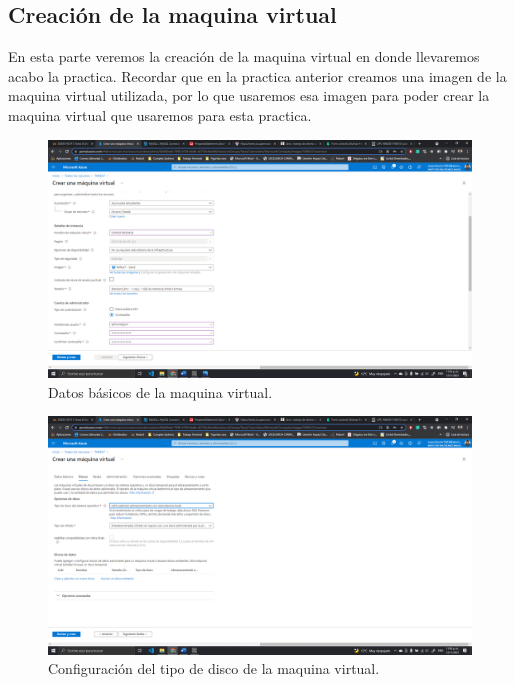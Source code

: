 \documentclass[11pt]{article}
\begin{document}
		\subsection{Creación de la maquina virtual}
En esta parte veremos la creación de la maquina virtual en donde llevaremos acabo la practica. Recordar que en la practica anterior creamos una imagen de la maquina virtual utilizada, por lo que usaremos esa imagen para poder crear la maquina virtual que usaremos para esta practica.
		\begin{figure}[H]
			\centering
			\includegraphics[scale=0.34]{resources/Infobasica.png}
			\caption{Datos básicos de la maquina virtual.}\label{fig:picture}
		\end{figure}
		\begin{figure}[H]
			\centering
			\includegraphics[scale=0.34]{resources/disco.png}
			\caption{Configuración del tipo de disco de la maquina virtual.}\label{fig:picture}
		\end{figure}
\end{document}
